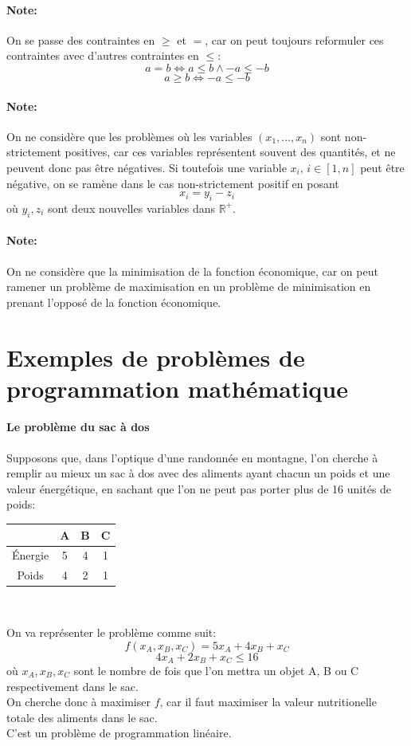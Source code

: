 \documentclass[a4paper]{report}
\begin{document}
\paragraph{Note:}On se passe des contraintes en \(\ge\) et \(=\), car on peut toujours reformuler ces contraintes avec d'autres contraintes en \(\le\):
\[a=b\Leftrightarrow a\le b\land -a\le-b\]
\[a\ge b\Leftrightarrow -a\le-b\]

\paragraph{Note:}On ne considère que les  problèmes où les variables \((x_1,\dots,x_n)\) sont non-strictement positives, car ces variables représentent souvent des quantités, et ne peuvent donc pas être négatives. Si toutefois une variable \(x_i,\,i\in[1,n]\) peut être négative, on se ramène dans le cas non-strictement positif en posant
\[x_i=y_i-z_i\]
où \(y_i,z_i\) sont deux nouvelles variables dans \(\mathbb{R}^+\).

\paragraph{Note:}On ne considère que la minimisation de la fonction
économique, car on peut ramener un problème de maximisation en un
problème de minimisation en prenant l'opposé de la fonction économique.

\section{Exemples de problèmes de programmation mathématique}
\paragraph{Le problème du sac à dos} Supposons que, dans l'optique d'une
randonnée en montagne, l'on cherche à remplir au mieux un sac à dos avec des
aliments ayant chacun un poids et une valeur énergétique, en sachant que l'on ne
peut pas porter plus de 16 unités de poids:
\begin{center}
\begin{tabular}{|c|c|c|c|}
\hline
 & A & B & C \\
\hline
Énergie & 5 & 4 & 1 \\
\hline
Poids & 4 & 2 & 1 \\
\hline
\end{tabular}
\\
\end{center}
On va représenter le problème comme suit:
\[f(x_A, x_B, x_C) =5x_A + 4x_B + x_C\]
\[4x_A + 2x_B + x_C \le 16\]
où \(x_A,x_B,x_C\) sont le nombre de fois que l'on mettra un objet A, B ou C
respectivement dans le sac.\\
On cherche donc à maximiser \(f\), car il faut maximiser la valeur nutritionelle
totale des aliments dans le sac.\\
C'est un problème de programmation linéaire.
\end{document}
